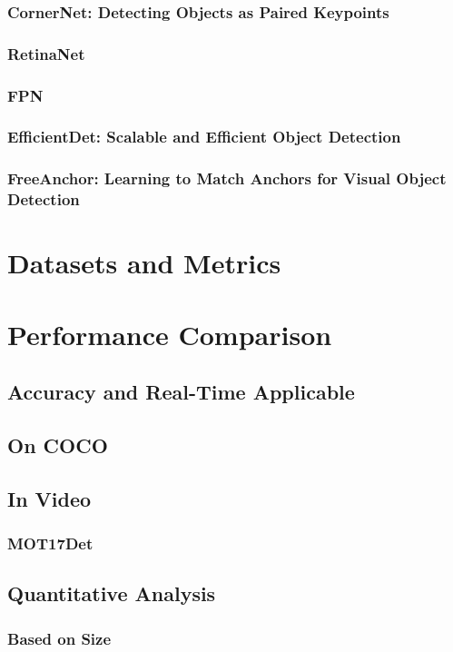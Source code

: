 \documentclass[12pt, oneside]{article}
\begin{document}
\subsubsection{CornerNet: Detecting Objects as Paired Keypoints}
\subsubsection{RetinaNet}
\subsubsection{FPN}
\subsubsection{EfficientDet: Scalable and Efficient Object Detection}
\subsubsection{FreeAnchor: Learning to Match Anchors for Visual Object Detection}

\section{Datasets and Metrics}
\section{Performance Comparison}
\subsection{Accuracy and Real-Time Applicable}
\subsection{On COCO}

\subsection{In Video}
\subsubsection{MOT17Det}

\subsection{Quantitative Analysis}
\subsubsection{Based on Size}
\end{document}
